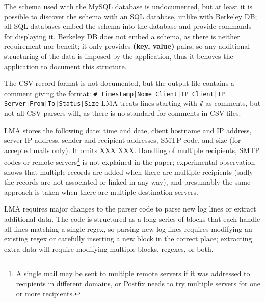 The schema used with the MySQL database is undocumented, but at least it is
possible to discover the schema with an \gls{SQL} database, unlike with
Berkeley DB\@; all \gls{SQL} databases embed the schema into the database
and provide commands for displaying it.  Berkeley DB does not embed a
schema, as there is neither requirement nor benefit; it only provides
\textbf{(key, value)} pairs, so any additional structuring of the data is
imposed by the application, thus it behoves the application to document
this structure.

The \gls{CSV} record format is not documented, but the output file contains
a comment giving the format:\newline{} \texttt{\# Timestamp|Nome Client|IP
Client|IP Server|From|To|Status|Size} \newline{}\gls{LMA} treats lines
starting with \texttt{\#} as comments, but not all \gls{CSV} parsers will,
as there is no standard for comments in \gls{CSV} files.

\gls{LMA} stores the following date: time and date, client hostname and
\gls{IP} address, server \gls{IP} address, sender and recipient addresses,
\gls{SMTP} code, and size (for accepted mails only).  It omits XXX XXX\@.
Handling of multiple recipients, \gls{SMTP} codes or remote
servers\footnote{A single mail may be sent to multiple remote servers if it
was addressed to recipients in different domains, or Postfix needs to try
multiple servers for one or more recipients.} is not explained in the
paper; experimental observation shows that multiple records are added when
there are multiple recipients (sadly the records are not associated or
linked in any way), and presumably the same approach is taken when there
are multiple destination servers.

\gls{LMA} requires major changes to the parser code to parse new log lines
or extract additional data.  The code is structured as a long series of
blocks that each handle all lines matching a single regex, so parsing new
log lines requires modifying an existing regex or carefully inserting a new
block in the correct place; extracting extra data will require modifying
multiple blocks, regexes, or both.

